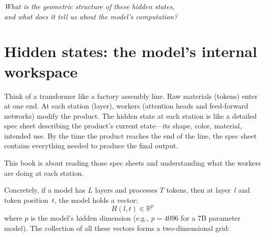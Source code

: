 \documentclass[11pt, twoside, openright]{memoir}
\begin{document}
\begin{center}
\large\itshape\color{Navy}
What is the geometric structure of these hidden states,\\
and what does it tell us about the model's computation?
\end{center}

\section{Hidden states: the model's internal workspace}

\begin{analogy}
Think of a transformer like a factory assembly line. Raw materials (tokens)
enter at one end. At each station (layer), workers (attention heads and
feed-forward networks) modify the product. The hidden state at each
station is like a detailed spec sheet describing the product's current
state---its shape, color, material, intended use. By the time the product
reaches the end of the line, the spec sheet contains everything needed to
produce the final output.

This book is about reading those spec sheets and understanding what the
workers are doing at each station.
\end{analogy}

Concretely, if a model has $L$ layers and processes $T$ tokens, then at
layer~$l$ and token position~$t$, the model holds a vector:
\[
  H(l, t) \in \mathbb{R}^p
\]
where $p$ is the model's hidden dimension (e.g., $p = 4096$ for a 7B
parameter model). The collection of all these vectors forms a
two-dimensional grid:

\begin{center}
\end{center}
\end{document}
